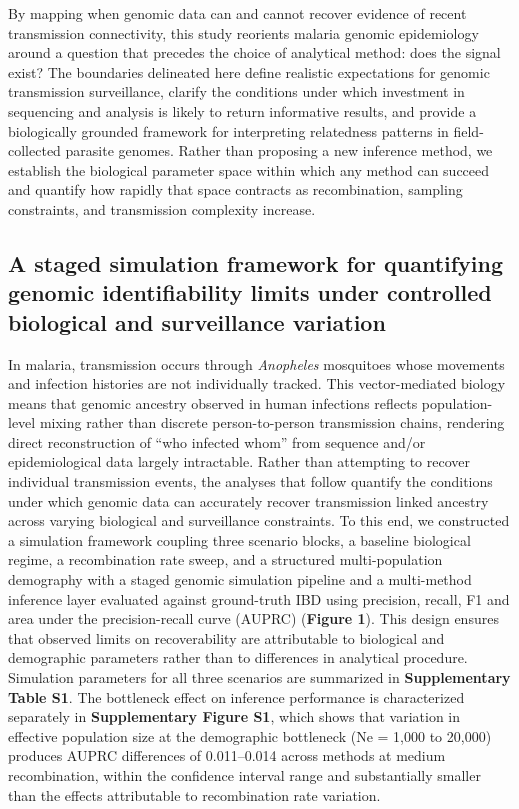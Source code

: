 \documentclass[
  11pt,
]{article}
\begin{document}
By mapping when genomic data can and cannot recover evidence of recent
transmission connectivity, this study reorients malaria genomic
epidemiology around a question that precedes the choice of analytical
method: does the signal exist? The boundaries delineated here define
realistic expectations for genomic transmission surveillance, clarify
the conditions under which investment in sequencing and analysis is
likely to return informative results, and provide a biologically
grounded framework for interpreting relatedness patterns in
field-collected parasite genomes. Rather than proposing a new inference
method, we establish the biological parameter space within which any
method can succeed and quantify how rapidly that space contracts as
recombination, sampling constraints, and transmission complexity
increase.

\subsection{A staged simulation framework for quantifying genomic
identifiability limits under controlled biological and surveillance
variation}\label{a-staged-simulation-framework-for-quantifying-genomic-identifiability-limits-under-controlled-biological-and-surveillance-variation}

In malaria, transmission occurs through \emph{Anopheles} mosquitoes
whose movements and infection histories are not individually tracked.
This vector-mediated biology means that genomic ancestry observed in
human infections reflects population-level mixing rather than discrete
person-to-person transmission chains, rendering direct reconstruction of
``who infected whom'' from sequence and/or epidemiological data largely
intractable. Rather than attempting to recover individual transmission
events, the analyses that follow quantify the conditions under which
genomic data can accurately recover transmission linked ancestry across
varying biological and surveillance constraints. To this end, we
constructed a simulation framework coupling three scenario blocks, a
baseline biological regime, a recombination rate sweep, and a structured
multi-population demography with a staged genomic simulation pipeline
and a multi-method inference layer evaluated against ground-truth IBD
using precision, recall, F1 and area under the precision-recall curve
(AUPRC) (\textbf{Figure 1}). This design ensures that observed limits on
recoverability are attributable to biological and demographic parameters
rather than to differences in analytical procedure. Simulation
parameters for all three scenarios are summarized in
\textbf{Supplementary Table S1}. The bottleneck effect on inference
performance is characterized separately in \textbf{Supplementary Figure
S1}, which shows that variation in effective population size at the
demographic bottleneck (Ne = 1,000 to 20,000) produces AUPRC differences
of 0.011--0.014 across methods at medium recombination, within the
confidence interval range and substantially smaller than the effects
attributable to recombination rate variation.
\end{document}

